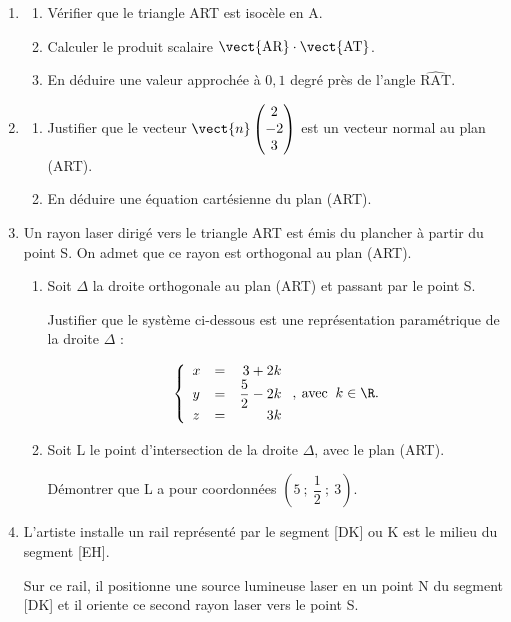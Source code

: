 \begin{enumerate}
\item 
	\begin{enumerate}
		\item Vérifier que le triangle ART est isocèle en A.
		\item Calculer le produit scalaire $\vect{\text{AR}} \cdot \vect{\text{AT}}$.
		\item En déduire une valeur approchée à $0,1$ degré près de l'angle $\widehat{\text{RAT}}$.
	\end{enumerate}
\item 
	\begin{enumerate}
		\item Justifier que le vecteur $\vect{n}\begin{pmatrix}2\\-2\\3\end{pmatrix}$ est un vecteur normal au plan (ART).
		\item En déduire une équation cartésienne du plan (ART).
	\end{enumerate}
\item Un rayon laser dirigé vers le triangle ART est émis du plancher à partir du point S. On admet que ce rayon est orthogonal au plan (ART).
	\begin{enumerate}
		\item Soit $\Delta$ la droite orthogonale au plan (ART) et passant par le point S.
		
Justifier que le système ci-dessous est une représentation paramétrique de la droite $\Delta$ :

\[\left\{\begin{array}{l c r}
x&=&3+2k\\
y&=& \dfrac52 - 2k\\
z &=& 3k
\end{array}\right.,\: \text{avec }\:k \in \R.\]

		\item Soit L le point d'intersection de la droite $\Delta$, avec le plan (ART).

Démontrer que L a pour coordonnées $\left(5~;~\dfrac12~;~3\right)$.
	\end{enumerate}
\item L'artiste installe un rail représenté  par le segment  [DK] ou K est le milieu du segment [EH].

Sur ce rail, il positionne une source lumineuse laser en un point N du segment [DK] et il oriente ce
second rayon laser vers le point S.


\end{enumerate}
